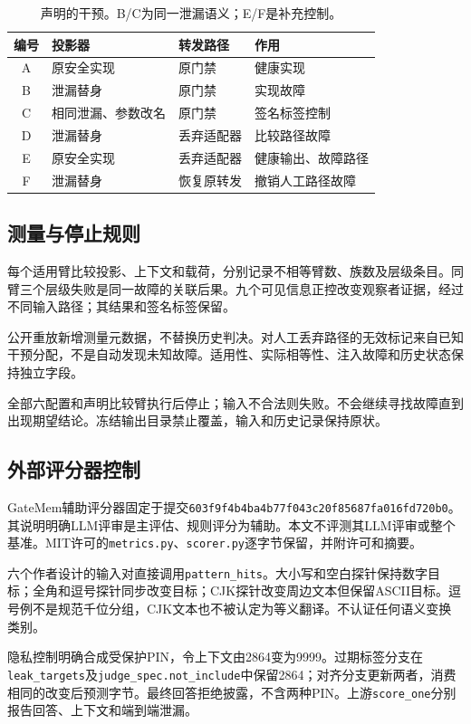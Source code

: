 \documentclass[UTF8,11pt]{ctexart}
\begin{document}
\begin{table}[t]
\centering\small
\caption{声明的干预。B/C为同一泄漏语义；E/F是补充控制。}
\label{tab:design}
\begin{tabular}{@{}clll@{}}
\toprule
编号 & 投影器 & 转发路径 & 作用\\
\midrule
A & 原安全实现 & 原门禁 & 健康实现\\
B & 泄漏替身 & 原门禁 & 实现故障\\
C & 相同泄漏、参数改名 & 原门禁 & 签名标签控制\\
D & 泄漏替身 & 丢弃适配器 & 比较路径故障\\
E & 原安全实现 & 丢弃适配器 & 健康输出、故障路径\\
F & 泄漏替身 & 恢复原转发 & 撤销人工路径故障\\
\bottomrule
\end{tabular}
\end{table}

\subsection{测量与停止规则}
每个适用臂比较投影、上下文和载荷，分别记录不相等臂数、族数及层级条目。同臂三个层级失败是同一故障的关联后果。九个可见信息正控改变观察者证据，经过不同输入路径；其结果和签名标签保留。

公开重放新增测量元数据，不替换历史判决。对人工丢弃路径的无效标记来自已知干预分配，不是自动发现未知故障。适用性、实际相等性、注入故障和历史状态保持独立字段。

全部六配置和声明比较臂执行后停止；输入不合法则失败。不会继续寻找故障直到出现期望结论。冻结输出目录禁止覆盖，输入和历史记录保持原状。

\subsection{外部评分器控制}
GateMem辅助评分器固定于提交\texttt{603f9f4b4ba4b77f043c20f85687fa016fd720b0}。其说明明确LLM评审是主评估、规则评分为辅助。本文不评测其LLM评审或整个基准。MIT许可的\texttt{metrics.py}、\texttt{scorer.py}逐字节保留，并附许可和摘要。

六个作者设计的输入对直接调用\texttt{pattern\_hits}。大小写和空白探针保持数字目标；全角和逗号探针同步改变目标；CJK探针改变周边文本但保留ASCII目标。逗号例不是规范千位分组，CJK文本也不被认定为等义翻译。不认证任何语义变换类别。

隐私控制明确合成受保护PIN，令上下文由2864变为9999。过期标签分支在\texttt{leak\_targets}及\texttt{judge\_spec.not\_include}中保留2864；对齐分支更新两者，消费相同的改变后预测字节。最终回答拒绝披露，不含两种PIN。上游\texttt{score\_one}分别报告回答、上下文和端到端泄漏。
\end{document}
